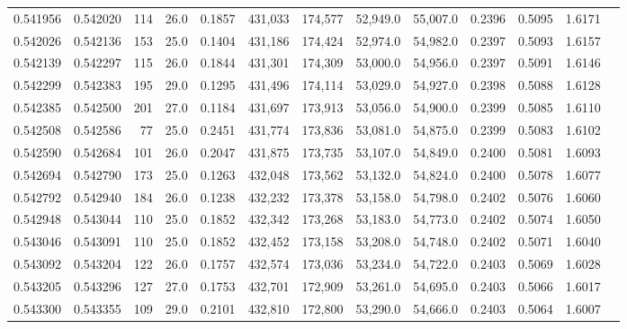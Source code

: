 \begin{tabular}{rrrrrrrrrrrrr}
0.541956 & 0.542020 &   114 & 26.0 &                                     0.1857 & 431,033 & 174,577 &  52,949.0 &  55,007.0 & 0.2396 & 0.5095 & 1.6171 \\
0.542026 & 0.542136 &   153 & 25.0 &                                     0.1404 & 431,186 & 174,424 &  52,974.0 &  54,982.0 & 0.2397 & 0.5093 & 1.6157 \\
0.542139 & 0.542297 &   115 & 26.0 &                                     0.1844 & 431,301 & 174,309 &  53,000.0 &  54,956.0 & 0.2397 & 0.5091 & 1.6146 \\
0.542299 & 0.542383 &   195 & 29.0 &                                     0.1295 & 431,496 & 174,114 &  53,029.0 &  54,927.0 & 0.2398 & 0.5088 & 1.6128 \\
0.542385 & 0.542500 &   201 & 27.0 &                                     0.1184 & 431,697 & 173,913 &  53,056.0 &  54,900.0 & 0.2399 & 0.5085 & 1.6110 \\
0.542508 & 0.542586 &    77 & 25.0 &                                     0.2451 & 431,774 & 173,836 &  53,081.0 &  54,875.0 & 0.2399 & 0.5083 & 1.6102 \\
0.542590 & 0.542684 &   101 & 26.0 &                                     0.2047 & 431,875 & 173,735 &  53,107.0 &  54,849.0 & 0.2400 & 0.5081 & 1.6093 \\
0.542694 & 0.542790 &   173 & 25.0 &                                     0.1263 & 432,048 & 173,562 &  53,132.0 &  54,824.0 & 0.2400 & 0.5078 & 1.6077 \\
0.542792 & 0.542940 &   184 & 26.0 &                                     0.1238 & 432,232 & 173,378 &  53,158.0 &  54,798.0 & 0.2402 & 0.5076 & 1.6060 \\
0.542948 & 0.543044 &   110 & 25.0 &                                     0.1852 & 432,342 & 173,268 &  53,183.0 &  54,773.0 & 0.2402 & 0.5074 & 1.6050 \\
0.543046 & 0.543091 &   110 & 25.0 &                                     0.1852 & 432,452 & 173,158 &  53,208.0 &  54,748.0 & 0.2402 & 0.5071 & 1.6040 \\
0.543092 & 0.543204 &   122 & 26.0 &                                     0.1757 & 432,574 & 173,036 &  53,234.0 &  54,722.0 & 0.2403 & 0.5069 & 1.6028 \\
0.543205 & 0.543296 &   127 & 27.0 &                                     0.1753 & 432,701 & 172,909 &  53,261.0 &  54,695.0 & 0.2403 & 0.5066 & 1.6017 \\
0.543300 & 0.543355 &   109 & 29.0 &                                     0.2101 & 432,810 & 172,800 &  53,290.0 &  54,666.0 & 0.2403 & 0.5064 & 1.6007 \\

\end{tabular}
